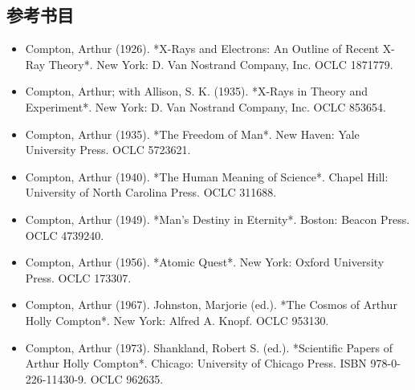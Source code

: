 \subsection{参考书目}
\begin{itemize}
\item Compton, Arthur (1926). *X-Rays and Electrons: An Outline of Recent X-Ray Theory*. New York: D. Van Nostrand Company, Inc. OCLC 1871779.
\item Compton, Arthur; with Allison, S. K. (1935). *X-Rays in Theory and Experiment*. New York: D. Van Nostrand Company, Inc. OCLC 853654.
\item Compton, Arthur (1935). *The Freedom of Man*. New Haven: Yale University Press. OCLC 5723621.
\item Compton, Arthur (1940). *The Human Meaning of Science*. Chapel Hill: University of North Carolina Press. OCLC 311688.
\item Compton, Arthur (1949). *Man's Destiny in Eternity*. Boston: Beacon Press. OCLC 4739240.
\item Compton, Arthur (1956). *Atomic Quest*. New York: Oxford University Press. OCLC 173307.
\item Compton, Arthur (1967). Johnston, Marjorie (ed.). *The Cosmos of Arthur Holly Compton*. New York: Alfred A. Knopf. OCLC 953130.
\item Compton, Arthur (1973). Shankland, Robert S. (ed.). *Scientific Papers of Arthur Holly Compton*. Chicago: University of Chicago Press. ISBN 978-0-226-11430-9. OCLC 962635.
\end{itemize}

